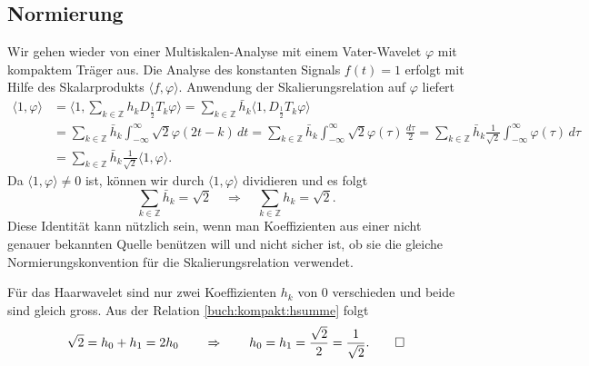 \subsection{Normierung}
Wir gehen wieder von einer Multiskalen-Analyse mit einem Vater-Wavelet
$\varphi$ mit kompaktem Träger aus.
Die Analyse des konstanten Signals $f(t)=1$ erfolgt mit Hilfe des
Skalarprodukts $\langle f,\varphi\rangle$.
Anwendung der Skalierungsrelation auf $\varphi$ liefert
\begin{align*}
\langle 1,\varphi\rangle
&=
\biggl\langle
1,\sum_{k\in\mathbb Z} h_kD_{\frac12}T_k\varphi
\biggr\rangle
=
\sum_{k\in\mathbb Z}
\bar{h}_k
\langle
1,
D_{\frac12}T_k\varphi
\rangle
\\
&=
\sum_{k\in\mathbb Z}
\bar{h}_k
\int_{-\infty}^\infty \sqrt{2}\varphi(2t-k)\,dt
=
\sum_{k\in\mathbb Z}
\bar{h}_k
\int_{-\infty}^\infty \sqrt{2} \varphi(\tau) \,\frac{d\tau}{2}
=
\sum_{k\in\mathbb Z}
\bar{h}_k
\frac{1}{\sqrt{2}}
\int_{-\infty}^\infty \varphi(\tau) \,d\tau
\\
&=
\sum_{k\in\mathbb Z}
\bar{h}_k
\frac{1}{\sqrt{2}}
\langle 1,\varphi\rangle.
\end{align*}
Da $\langle 1,\varphi\rangle\ne 0$ ist, können wir durch
$\langle 1,\varphi\rangle$ dividieren und es folgt
\begin{equation}
\sum_{k\in\mathbb Z} \bar{h}_k = \sqrt{2}
\quad\Rightarrow\quad
\sum_{k\in\mathbb Z} h_k = \sqrt{2}.
\label{buch:kompakt:hsumme}
\end{equation}
Diese Identität kann nützlich sein, wenn man Koeffizienten aus einer
nicht genauer bekannten Quelle benützen will und nicht sicher ist,
ob sie die gleiche Normierungskonvention für die Skalierungsrelation
verwendet.

\begin{beispiel}
Für das Haarwavelet sind nur zwei Koeffizienten $h_k$ von $0$ verschieden
und beide sind gleich gross.
Aus der Relation \eqref{buch:kompakt:hsumme} folgt
\[
\sqrt{2}
=
h_0+h_1
=2h_0
\qquad\Rightarrow\qquad
h_0 = h_1 = \frac{\sqrt{2}}{2}=\frac{1}{\sqrt{2}}.
\qedhere
\]
\end{beispiel}

